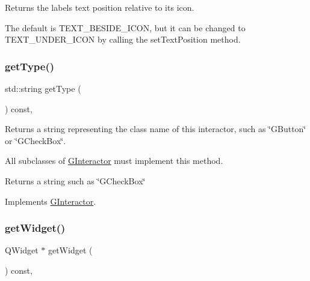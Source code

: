 Returns the label\textquotesingle{}s text position relative to its icon. 

The default is T\+E\+X\+T\+\_\+\+B\+E\+S\+I\+D\+E\+\_\+\+I\+C\+ON, but it can be changed to T\+E\+X\+T\+\_\+\+U\+N\+D\+E\+R\+\_\+\+I\+C\+ON by calling the set\+Text\+Position method. \mbox{\label{classsgl_1_1GLabel_a9b72ede4ee8520f987a0c01e30654814}} 
\subsubsection{\texorpdfstring{get\+Type()}{getType()}}
{\footnotesize\ttfamily std\+::string get\+Type (\begin{DoxyParamCaption}{ }\end{DoxyParamCaption}) const\hspace{0.3cm}{\ttfamily [override]}, {\ttfamily [virtual]}}



Returns a string representing the class name of this interactor, such as \char`\"{}\+G\+Button\char`\"{} or \char`\"{}\+G\+Check\+Box\char`\"{}. 

All subclasses of \mbox{\hyperlink{classsgl_1_1GInteractor}{G\+Interactor}} must implement this method. \begin{DoxyReturn}{Returns}
a string such as \char`\"{}\+G\+Check\+Box\char`\"{} 
\end{DoxyReturn}


Implements \mbox{\hyperlink{classsgl_1_1GInteractor_a44c407a54a20dd0f2fff30338289299d}{G\+Interactor}}.

\mbox{\label{classsgl_1_1GLabel_a3b33a602b31a6b809d020535a59db3b4}} 
\subsubsection{\texorpdfstring{get\+Widget()}{getWidget()}}
{\footnotesize\ttfamily Q\+Widget $\ast$ get\+Widget (\begin{DoxyParamCaption}{ }\end{DoxyParamCaption}) const\hspace{0.3cm}{\ttfamily [override]}, {\ttfamily [virtual]}}



